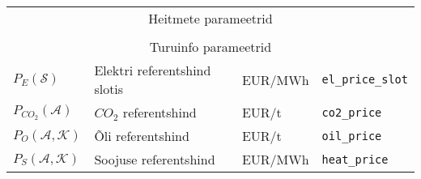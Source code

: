 \begin{landscape}
\begin{longtable}{l l l l}
\\ \multicolumn{4}{c}{Heitmete parameetrid} \\

\\ \multicolumn{4}{c}{Turuinfo parameetrid} \\
$\mathit{P_E}(\mathcal{S})$ & Elektri referentshind slotis & EUR/MWh & \texttt{el\_price\_slot}\\
$\mathit{P_{CO_2}}(\mathcal{A})$ & $CO_2$ referentshind & EUR/t & \texttt{co2\_price}\\
$\mathit{P_O}(\mathcal{A},\mathcal{K})$ & Õli referentshind & EUR/t & \texttt{oil\_price}\\
$\mathit{P_S}(\mathcal{A},\mathcal{K})$ & Soojuse referentshind & EUR/MWh & \texttt{heat\_price}\\


\end{longtable}
\end{landscape}
